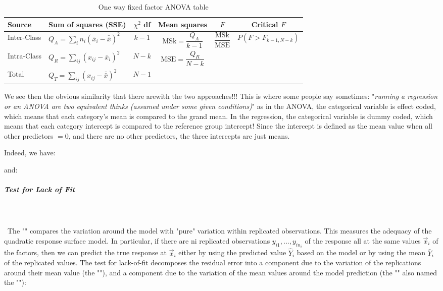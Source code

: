 	\begin{table}[H]\small
		\renewcommand{\arraystretch}{1.2}
		\centering
		\begin{tabular}{llcccc}\hline
		\textbf{Source} & \textbf{Sum of squares (SSE)} & $\chi^2$ \textbf{df} & \textbf{Mean squares} & $F$ & \textbf{Critical} $F$\\ \hline
		Inter-Class & $Q_A=\displaystyle\sum_{i}n_i\left(\bar{x}_{i}-\bar{\bar{x}}\right)^2$ & $k-1$ & $\text{MSk}=\displaystyle\dfrac{Q_A}{k-1}$ &
		$\displaystyle\dfrac{\text{MSk}}{\text{MSE}}$ & $P(F> F_{k-1,N-k})$ \\
		Intra-Class & $Q_R=\displaystyle\sum_{ij}\left(x_{ij}-\bar{x}_i\right)^2$ & $N-k$ & $ \text{MSE}=\displaystyle\dfrac{Q_R}{N-k}$  & & \\
		Total & $Q_T=\displaystyle\sum_{ij}\left(x_{ij}-\bar{\bar{x}}\right)^2$ & $N-1$ & & &\\ \hline
		\end{tabular}
		\caption[]{One way fixed factor ANOVA table}
	\end{table}
	We see then the obvious similarity that there  arewith the two approaches!!! This is where some people say sometimes: "\textit{running a regression or an ANOVA are two equivalent thinks (assumed under some given conditions)}" as in the ANOVA, the categorical variable is effect coded, which means that each category's mean is compared to the grand mean. In the regression, the categorical variable is dummy coded, which means that each category intercept is compared to the reference group intercept! Since the intercept is defined as the mean value when all other predictors $= 0$, and there are no other predictors, the three intercepts are just means.
	
	Indeed, we have:
	
	and:
	
	
	\subparagraph{Test for Lack of Fit}\label{test for lack of fit}\mbox{}\\\\\
	The "" compares the variation around the model with "pure" variation within replicated observations. This measures the adequacy of the quadratic response surface model. In particular, if there are ni replicated observations $y_{i1}, ... ,y_{in_i}$ of the response all at the same values $\vec{x}_i$ of the factors, then we can predict the true response at $\vec{x}_i$ either by using the predicted value $\hat{Y}_i$ based on the model or by using the mean $\bar{Y}_i$ of the replicated values. The test for lack-of-fit decomposes the residual error into a component due to the variation of the replications around their mean value (the ""), and a component due to the variation of the mean values around the model prediction (the "" also named the ""):
	
